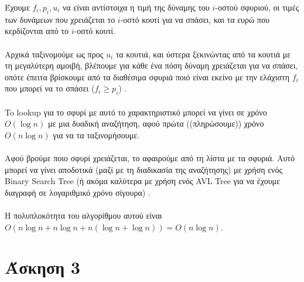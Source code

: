 \documentclass[12pt,a4paper]{article}
\begin{document}
    Έχουμε \( f_i, p_i, u_i \) να είναι αντίστοιχα η τιμή της δύναμης του \( i 
    \)-οστού σφυριού, οι τιμές των δυνάμεων που χρειάζεται το \( i \)-οστό κουτί
    για να σπάσει, και τα ευρώ που κερδίζονται από το \( i \)-οστό κουτί.\\
    \\
    Αρχικά ταξινομούμε ως προς \( u_i \) τα κουτιά, και ύστερα ξεκινώντας από τα
    κουτιά με τη μεγαλύτερη αμοιβή, βλέπουμε για κάθε ένα πόση δύναμη χρειάζεται
    για να σπάσει, οπότε έπειτα βρίσκουμε από τα διαθέσιμα σφυριά ποιό είναι
    εκείνο με την ελάχιστη \( f_i \) που μπορεί να το σπάσει (\( f_i \ge p_i \))
    .\\
    \\
    To {\latintext lookup} για το σφυρί με αυτό το χαρακτηριστικό μπορεί να
    γίνει σε χρόνο \( Ο(\log{n}) \) με μια δυαδική αναζήτηση, αφού πρώτα
    ((πληρώσουμε)) χρόνο \( Ο(n\log{n}) \) για να τα ταξινομήσουμε.\\
    \\
    Αφού βρούμε ποιο σφυρί χρειάζεται, το αφαιρούμε από τη λίστα με τα σφυριά.
    Αυτό μπορεί να γίνει αποδοτικά (μαζί με τη διαδικασία της αναζήτησης) με
    χρήση ενός {\latintext Binary Search Tree} (ή ακόμα καλύτερα με χρήση ενός
    {\latintext AVL Tree} για να έχουμε διαγραφή σε λογαριθμικό χρόνο σίγουρα)
    .\\
    \\
    Η πολυπλοκότητα του αλγορίθμου αυτού είναι \( O(n\log{n} + n\log{n} +
    n(\log{n} + \log{n})) = O(n\log{n}) \).

  \section{Άσκηση 3}
  
\end{document}
